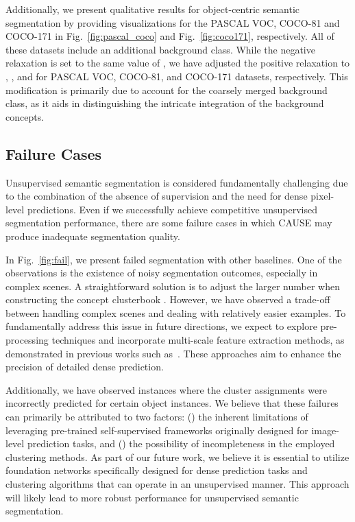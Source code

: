\documentclass{article} \usepackage{iclr2024_conference,times}
\begin{document}
Additionally, we present qualitative results for object-centric semantic segmentation by providing visualizations for the PASCAL VOC, COCO-81 and COCO-171 in Fig.~\ref{fig:pascal_coco} and Fig.~\ref{fig:coco171}, respectively. All of these datasets include an additional background class. While the negative relaxation is set to the same value of , we have adjusted the positive relaxation to , , and  for PASCAL VOC, COCO-81, and COCO-171 datasets, respectively. This modification is primarily due to account for the coarsely merged background class, as it aids in distinguishing the intricate integration of the background concepts.

\subsection{Failure Cases}
Unsupervised semantic segmentation is considered fundamentally challenging due to the combination of the absence of supervision and the need for dense pixel-level predictions. Even if we successfully achieve competitive unsupervised segmentation performance, there are some failure cases in which CAUSE may produce inadequate segmentation quality. 

In Fig.~\ref{fig:fail}, we present failed segmentation with other baselines. One of the observations is the existence of noisy segmentation outcomes, especially in complex scenes. A straightforward solution is to adjust the larger number  when constructing the concept clusterbook . However, we have observed a trade-off between handling complex scenes and dealing with relatively easier examples. 
To fundamentally address this issue in future directions, we expect to explore pre-processing techniques and incorporate multi-scale feature extraction methods, as demonstrated in previous works such as~\citet{kirillov2019panoptic, kim2023universal, ranftl2021vision}. These approaches aim to enhance the precision of detailed dense prediction.

Additionally, we have observed instances where the cluster assignments were incorrectly predicted for certain object instances. We believe that these failures can primarily be attributed to two factors: (\lowercase\expandafter{}) the inherent limitations of leveraging pre-trained self-supervised frameworks originally designed for image-level prediction tasks, and (\lowercase\expandafter{}) the possibility of incompleteness in the employed clustering methods. As part of our future work, we believe it is essential to utilize foundation networks specifically designed for dense prediction tasks and clustering algorithms that can operate in an unsupervised manner. This approach will likely lead to more robust performance for unsupervised semantic segmentation.
\end{document}
